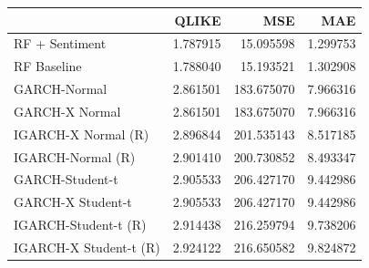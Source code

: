 \begin{table}[htbp]
\centering
\begin{tabular}{lrrr}
\toprule
 & QLIKE & MSE & MAE \\
\midrule
RF + Sentiment & 1.787915 & 15.095598 & 1.299753 \\
RF Baseline & 1.788040 & 15.193521 & 1.302908 \\
GARCH-Normal & 2.861501 & 183.675070 & 7.966316 \\
GARCH-X Normal & 2.861501 & 183.675070 & 7.966316 \\
IGARCH-X Normal (R) & 2.896844 & 201.535143 & 8.517185 \\
IGARCH-Normal (R) & 2.901410 & 200.730852 & 8.493347 \\
GARCH-Student-t & 2.905533 & 206.427170 & 9.442986 \\
GARCH-X Student-t & 2.905533 & 206.427170 & 9.442986 \\
IGARCH-Student-t (R) & 2.914438 & 216.259794 & 9.738206 \\
IGARCH-X Student-t (R) & 2.924122 & 216.650582 & 9.824872 \\
\bottomrule
\end{tabular}
\label{tab:forecast_loss_summary}
\end{table}

